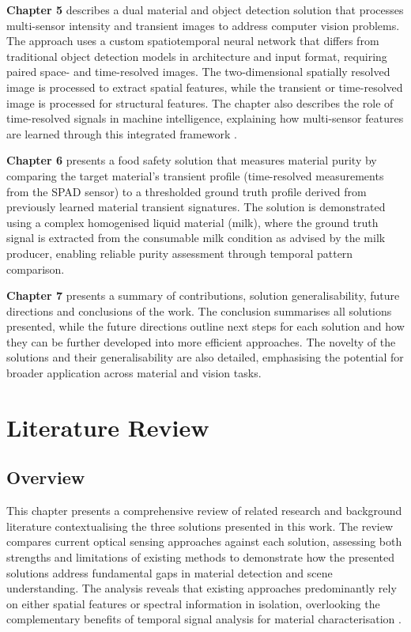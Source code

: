 \documentclass[12pt,a4paper,oneside]{report}
\let\oldsection\section
\renewcommand{\section}{\clearpage\oldsection}
\let\oldchapter\chapter
\renewcommand{\chapter}{\thispagestyle{fancy}\oldchapter}
\begin{document}
\textbf{Chapter 5} describes a dual material and object detection solution that processes multi-sensor intensity and transient images to address computer vision problems. The approach uses a custom spatiotemporal neural network that differs from traditional object detection models in architecture and input format, requiring paired space- and time-resolved images. The two-dimensional spatially resolved image is processed to extract spatial features, while the transient or time-resolved image is processed for structural features. The chapter also describes the role of time-resolved signals in machine intelligence, explaining how multi-sensor features are learned through this integrated framework \cite{tachella2019,jungerman2022}.

\textbf{Chapter 6} presents a food safety solution that measures material purity by comparing the target material's transient profile (time-resolved measurements from the SPAD sensor) to a thresholded ground truth profile derived from previously learned material transient signatures. The solution is demonstrated using a complex homogenised liquid material (milk), where the ground truth signal is extracted from the consumable milk condition as advised by the milk producer, enabling reliable purity assessment through temporal pattern comparison.

\textbf{Chapter 7} presents a summary of contributions, solution generalisability, future directions and conclusions of the work. The conclusion summarises all solutions presented, while the future directions outline next steps for each solution and how they can be further developed into more efficient approaches. The novelty of the solutions and their generalisability are also detailed, emphasising the potential for broader application across material and vision tasks.

\newpage
\chapter{Literature Review}
\label{chap:literature_review}

\newpage
\section{Overview}
\label{sec:lit_review_overview}

This chapter presents a comprehensive review of related research and background literature contextualising the three solutions presented in this work. The review compares current optical sensing approaches against each solution, assessing both strengths and limitations of existing methods to demonstrate how the presented solutions address fundamental gaps in material detection and scene understanding. The analysis reveals that existing approaches predominantly rely on either spatial features or spectral information in isolation, overlooking the complementary benefits of temporal signal analysis for material characterisation \cite{schwartz2013,sharan2013,su2016,becker2023}.
\end{document}
